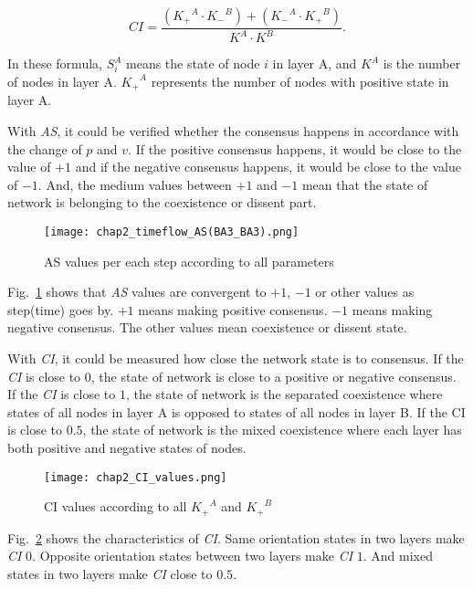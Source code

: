 \begin{equation}
CI = \frac{{({K_ + }^A \cdot {K_ - }^B) + ({K_ - }^A \cdot {K_ + }^B)}}{{{K^A} \cdot {K^B}}}.
\end{equation}

In these formula, $S_i^A$ means the state of node $i$ in layer A, and $K^A$ is the number of nodes in layer A. ${K_ + }^A$ represents the number of nodes with positive state in layer A.   

With \textit{AS}, it could be verified whether the consensus happens in accordance with the change of $p$ and $v$.  If the positive consensus happens, it would be close to the value of $+1$ and if the negative consensus happens, it would be close to the value of $-1$. And, the medium values between $+1$ and $-1$ mean that the state of network is belonging to the coexistence or dissent part.

\begin{figure}[!htb]
	\centering
	\texttt{[image: chap2\_timeflow\_AS(BA3\_BA3).png]}
	\caption{AS values per each step according to all parameters}
	\label{chap2_timeflow_AS(BA3_BA3)}
\end{figure}

Fig.~\ref{chap2_timeflow_AS(BA3_BA3)} shows that \textit{AS} values are convergent to $+1$, $-1$ or other values as step(time) goes by. $+1$ means making positive consensus. $-1$ means making negative consensus. The other values mean coexistence or dissent state. 

With \textit{CI}, it could be measured how close the network state is to consensus. If the \textit{CI} is close to $0$, the state of network is close to a positive or negative consensus. If the \textit{CI} is close to $1$, the state of network is the separated coexistence where states of all nodes in layer A is opposed to states of all nodes in layer B. If the CI is close to $0.5$, the state of network is the mixed coexistence where each layer has both positive and negative states of nodes.

\begin{figure}[!htb]
	\centering
	\texttt{[image: chap2\_CI\_values.png]}
	\caption{CI values according to all ${K_ + }^A$ and ${K_ + }^B$  }
	\label{chap2_CI_values}
\end{figure}

Fig.~\ref{chap2_CI_values} shows the characteristics of \textit{CI}. Same orientation states in two layers make \textit{CI} $0$. Opposite orientation states between two layers make \textit{CI} $1$. And mixed states in two layers make \textit{CI} close to $0.5$.

